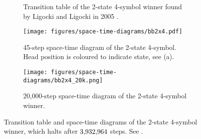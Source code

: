 \begin{figure}[ht]
    \centering
    \renewcommand{\arraystretch}{1.3}
    \setlength{\tabcolsep}{6pt}

    \begin{subfigure}[b]{0.28\textwidth}
        \centering
        \caption{Transition table of the 2-state 4-symbol \BBfull winner found by Ligocki and Ligocki in 2005 \cite{PMichel_website}.}
        \label{table:bb2x4}
    \end{subfigure}
    \hfill
    \begin{subfigure}[b]{0.31\textwidth}
        \centering
        \texttt{[image: figures/space-time-diagrams/bb2x4.pdf]}
        \caption{45-step space-time diagram of the 2-state 4-symbol. Head position is coloured to indicate state, see (a).}
        \label{fig:bb2x4-diagram}
    \end{subfigure}
    \hfill
    \begin{subfigure}[b]{0.32\textwidth}
        \centering
        \texttt{[image: figures/space-time-diagrams/bb2x4\_20k.png]}
        \caption{20,000-step space-time diagram of the 2-state 4-symbol winner.}
        \label{fig:bb2x4-diagram-zoomout}
    \end{subfigure}

    \caption{Transition table and space-time diagrams of the 2-state 4-symbol \BBfull winner, which halts after $3{,}932{,}964$ steps. See
        .}
    \label{fig:bb2x4}
\end{figure}